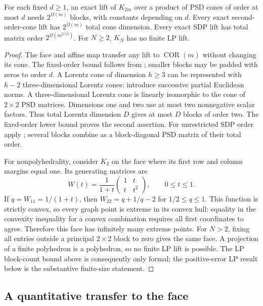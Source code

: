 \begin{corollary}\label{app:exact-conic}
For each fixed $d\ge1$, an exact lift of $K_{2m}$ over a product of
PSD cones of order at most $d$ needs $2^{\Omega(m)}$ blocks, with
constants depending on $d$. Every exact second-order-cone lift has
$2^{\Omega(m)}$ total cone dimension. Every exact SDP lift has total
matrix order $2^{\Omega(m^{2/13})}$. For $N\ge2$, $K_N$ has no finite
LP lift.
\end{corollary}
\begin{proof}
The face and affine map transfer any lift to $\operatorname{COR}(m)$
without changing its cone. The fixed-order bound follows from
\citet[Theorem~1]{s6:fawzi2013}; smaller blocks may be padded with
zeros to order $d$. A Lorentz cone of dimension $h\ge3$ can be
represented with $h-2$ three-dimensional Lorentz cones: introduce
successive partial Euclidean norms. A three-dimensional Lorentz cone
is linearly isomorphic to the cone of $2\times2$ PSD matrices.
Dimensions one and two use at most two nonnegative scalar factors.
Thus total Lorentz dimension $D$ gives at most $D$ blocks of order
two. The fixed-order lower bound proves the second assertion.
For unrestricted SDP order apply
\citet[Theorem~1.1]{s6:lrs-full}; several blocks combine as a
block-diagonal PSD matrix of their total order.

For nonpolyhedrality, consider $K_2$ on the face where its first row
and column margins equal one. Its generating matrices are
\[
 W(t)=\frac1{1+t}\begin{pmatrix}1&t\\t&t^2\end{pmatrix},
 \qquad 0\le t\le1.
\]
If $q=W_{11}=1/(1+t)$, then $W_{22}=q+1/q-2$ for
$1/2\le q\le1$. This function is strictly convex, so every graph
point is extreme in its convex hull: equality in the convexity
inequality for a convex combination requires all first coordinates
to agree. Therefore this face has infinitely many extreme points.
For $N>2$, fixing all entries outside a principal $2\times2$ block
to zero gives the same face. A projection of a finite polyhedron is
a polyhedron, so no finite LP lift is possible. The LP block-count
bound above is consequently only formal; the positive-error LP result
below is the substantive finite-size statement.
\end{proof}

\subsection{A quantitative transfer to the face}

